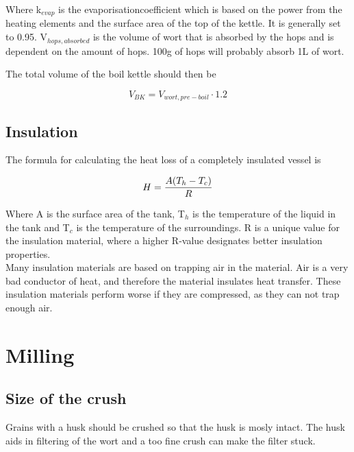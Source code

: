 \documentclass[11pt,fleqn]{book} %
\begin{document}
Where k$_{evap}$ is the evaporisationcoefficient which is based on the power from the heating elements and the surface area of the top of the kettle. It is generally set to 0.95. V$_{hops, absorbed}$ is the volume of wort that is absorbed by the hops and is dependent on the amount of hops. 100g of hops will probably absorb 1L of wort.

The total volume of the boil kettle should then be

\begin{equation}
V_{BK} = V_{wort, pre-boil} \cdot 1.2
\end{equation}

\section{Insulation}

The formula for calculating the heat loss of a completely insulated vessel is

\begin{equation}
H = {{A (T_h - T_c)} \over R}
\end{equation}

Where A is the surface area of the tank, T$_h$ is the temperature of the liquid in the tank and T$_c$ is the temperature of the surroundings. R is a unique value for the insulation material, where a higher R-value designates better insulation properties.\\

Many insulation materials are based on trapping air in the material. Air is a very bad conductor of heat, and therefore the material insulates heat transfer. These insulation materials perform worse if they are compressed, as they can not trap enough air.




\chapter{Milling}

\section{Size of the crush}

Grains with a husk should be crushed so that the husk is mosly intact. The husk aids in filtering of the wort and a too fine crush can make the filter stuck.
\end{document}
